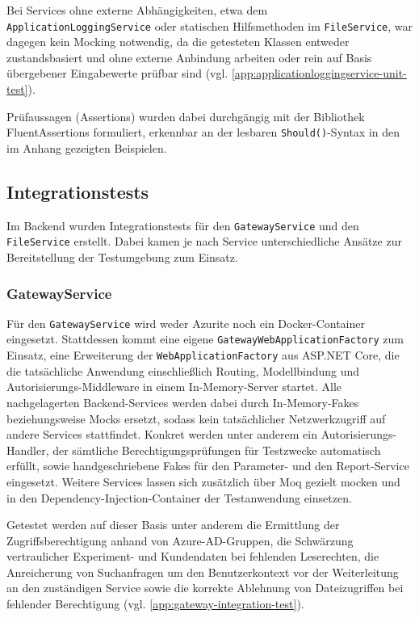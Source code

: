 Bei Services ohne externe Abhängigkeiten, etwa dem \texttt{ApplicationLoggingService} oder statischen Hilfsmethoden im \texttt{FileService}, war dagegen kein Mocking notwendig, da die getesteten Klassen entweder zustandsbasiert und ohne externe Anbindung arbeiten oder rein auf Basis übergebener Eingabewerte prüfbar sind (vgl. \autoref{app:applicationloggingservice-unit-test}).

Prüfaussagen (Assertions) wurden dabei durchgängig mit der Bibliothek FluentAssertions formuliert, erkennbar an der lesbaren \texttt{Should()}-Syntax in den im Anhang gezeigten Beispielen.

\subsection{Integrationstests}
Im Backend wurden Integrationstests für den \texttt{GatewayService} und den \texttt{FileService} erstellt. Dabei kamen je nach Service unterschiedliche Ansätze zur Bereitstellung der Testumgebung zum Einsatz.

\subsubsection{GatewayService}
Für den \texttt{GatewayService} wird weder Azurite noch ein Docker-Container eingesetzt. Stattdessen kommt eine eigene \texttt{GatewayWebApplicationFactory} zum Einsatz, eine Erweiterung der \texttt{WebApplicationFactory} aus ASP.NET Core, die die tatsächliche Anwendung einschließlich Routing, Modellbindung und Autorisierungs-Middleware in einem In-Memory-Server startet. Alle nachgelagerten Backend-Services werden dabei durch In-Memory-Fakes beziehungsweise Mocks ersetzt, sodass kein tatsächlicher Netzwerkzugriff auf andere Services stattfindet. Konkret werden unter anderem ein Autorisierungs-Handler, der sämtliche Berechtigungsprüfungen für Testzwecke automatisch erfüllt, sowie handgeschriebene Fakes für den Parameter- und den Report-Service eingesetzt. Weitere Services lassen sich zusätzlich über Moq gezielt mocken und in den Dependency-Injection-Container der Testanwendung einsetzen.

Getestet werden auf dieser Basis unter anderem die Ermittlung der Zugriffsberechtigung anhand von Azure-AD-Gruppen, die Schwärzung vertraulicher Experiment- und Kundendaten bei fehlenden Leserechten, die Anreicherung von Suchanfragen um den Benutzerkontext vor der Weiterleitung an den zuständigen Service sowie die korrekte Ablehnung von Dateizugriffen bei fehlender Berechtigung (vgl. \autoref{app:gateway-integration-test}). 

